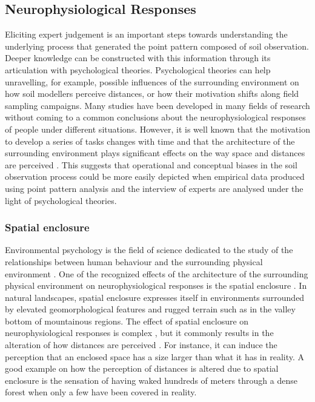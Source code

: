 \subsection{Neurophysiological Responses}

Eliciting expert judgement is an important steps towards understanding the underlying process that generated 
the point pattern composed of soil observation. Deeper knowledge can be constructed with this information 
through its articulation with psychological theories. Psychological theories can help unravelling, for 
example, possible influences of the surrounding environment on how soil modellers perceive distances, or how 
their motivation shifts along field sampling campaigns. Many studies have been developed in many fields of 
research \cite{Hull1932, BonnesEtAl2002, StampsEtAl2004, BonezziEtAl2011, Toure-TilleryEtAl2011a} without 
coming to a common conclusions about the neurophysiological responses of people under different situations. 
However, it is well known that the motivation to develop a series of tasks changes with time 
\cite{BonezziEtAl2011, Toure-TilleryEtAl2011a} and that the architecture of the surrounding environment plays 
significant effects on the way space and distances are perceived \cite{Coeterier1994, EpsteinEtAl1998}. This 
suggests that operational and conceptual biases in the soil observation process could be more easily depicted 
when empirical data produced using point pattern analysis and the interview of experts are analysed under the 
light of psychological theories.

\subsubsection{Spatial enclosure}

Environmental psychology is the field of science dedicated to the study of the relationships between human 
behaviour and the surrounding physical environment \cite{BonnesEtAl2002}. One of the recognized effects of the 
architecture of the surrounding physical environment on neurophysiological responses is the spatial enclosure 
\cite{EpsteinEtAl1998}. In natural landscapes, spatial enclosure expresses itself in environments surrounded by
elevated geomorphological features and rugged terrain such as in the valley bottom of mountainous regions. The 
effect of spatial enclosure on neurophysiological responses is complex \cite{StampsEtAl2004}, but it commonly 
results in the alteration of how distances are perceived \cite{Coeterier1994}. For instance, it can induce the 
perception that an enclosed space has a size larger than what it has in reality. A good example on how the 
perception of distances is altered due to spatial enclosure is the sensation of having waked hundreds of meters 
through a dense forest when only a few have been covered in reality.

